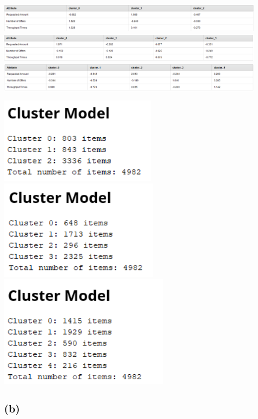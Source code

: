 \documentclass[../../main.tex]{subfiles}
\begin{document}
\includegraphics[width=\textwidth]{img/QUESTION_3a_kmeans_3_centroids.png}
\includegraphics[width=\textwidth]{img/QUESTION_3a_kmeans_4_centroids.png}
\includegraphics[width=\textwidth]{img/QUESTION_3a_kmeans_5_centroids.png}

\includegraphics[width=\textwidth/3]{img/QUESTION_3a_kmeans_3_cluster_sizes.png}
\includegraphics[width=\textwidth/3]{img/QUESTION_3a_kmeans_4_cluster_sizes.png}
\includegraphics[width=\textwidth/3]{img/QUESTION_3a_kmeans_5_cluster_sizes.png}

\subsection*{(b)}
\end{document}
